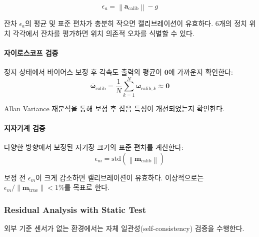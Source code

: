                 \begin{equation}
                    \epsilon_a = \left\| \mathbf{a}_{\text{calib}} \right\| - g
                    \label{eq:accel_residual}
                \end{equation}

                잔차 $\epsilon_a$의 평균 및 표준 편차가 충분히 작으면 캘리브레이션이 유효하다. 6개의 정치 위치 각각에서 잔차를 평가하면 위치 의존적 오차를 식별할 수 있다.\\

            \paragraph{자이로스코프 검증}
                정지 상태에서 바이어스 보정 후 각속도 출력의 평균이 $\mathbf{0}$에 가까운지 확인한다:\\

                \begin{equation}
                    \bar{\boldsymbol{\omega}}_{\text{calib}} = \frac{1}{N}\sum_{k=1}^N \boldsymbol{\omega}_{\text{calib},k} \approx \mathbf{0}
                    \label{eq:gyro_residual}
                \end{equation}

                Allan Variance 재분석을 통해 보정 후 잡음 특성이 개선되었는지 확인한다.\\

            \paragraph{지자기계 검증}
                다양한 방향에서 보정된 자기장 크기의 표준 편차를 계산한다:\\

                \begin{equation}
                    \epsilon_m = \text{std}\left( \left\| \mathbf{m}_{\text{calib}} \right\| \right)
                    \label{eq:mag_residual}
                \end{equation}

                보정 전 $\epsilon_m$이 크게 감소하면 캘리브레이션이 유효하다. 이상적으로는 $\epsilon_m / \|\mathbf{m}_{\text{true}}\| < 1\%$를 목표로 한다.\\

        \subsubsection{Residual Analysis with Static Test}
            외부 기준 센서가 없는 환경에서는 자체 일관성(self-consistency) 검증을 수행한다.\\

